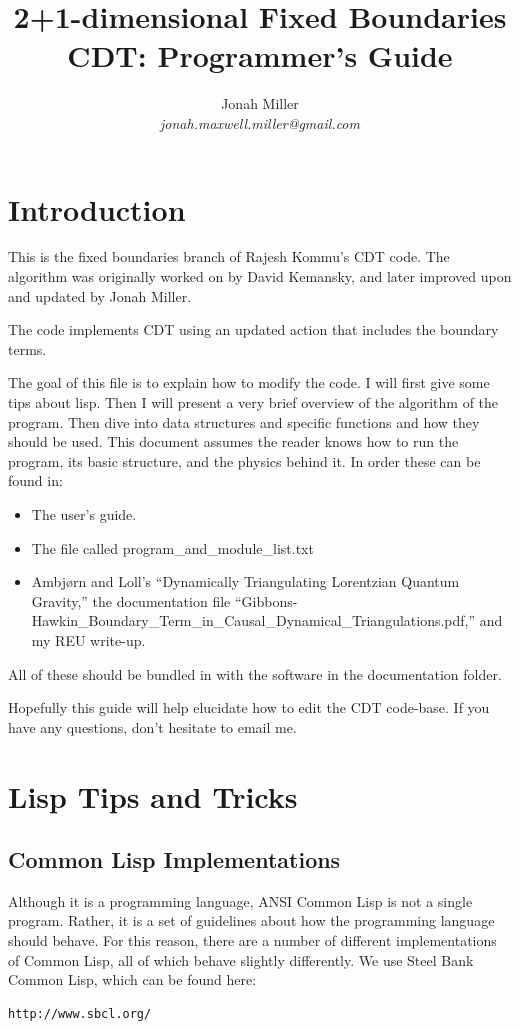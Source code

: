 \message{ !name(programmers_guide.tex)}\documentclass[12pt]{article}
\author{Jonah Miller\\
\textit{jonah.maxwell.miller@gmail.com}}
\title{2+1-dimensional Fixed Boundaries CDT: Programmer's Guide}
\begin{document}

\maketitle

\section{Introduction}
\label{s:intro}

This is the fixed boundaries branch of Rajesh Kommu's CDT code. The
algorithm was originally worked on by David Kemansky, and later
improved upon and updated by Jonah Miller.

The code implements CDT using an updated action that includes the
boundary terms.

The goal of this file is to explain how to modify the code. I will
first give some tips about lisp. Then I will present a very brief
overview of the algorithm of the program. Then dive into data
structures and specific functions and how they should be used. This
document assumes the reader knows how to run the program, its basic
structure, and the physics behind it. In order these can be found in:
\begin{itemize}
\item The user's guide.
\item The file called program\_and\_module\_list.txt
\item Ambj\o rn and Loll's ``Dynamically Triangulating Lorentzian
  Quantum Gravity,'' the documentation file
  ``Gibbons-Hawkin\_Boundary\_Term\_in\_Causal\_Dynamical\_Triangulations.pdf,''
  and my REU write-up.
\end{itemize}
All of these should be bundled in with the software in the
documentation folder.

Hopefully this guide will help elucidate how to edit the CDT
code-base. If you have any questions, don't hesitate to email me.

\section{Lisp Tips and Tricks}
\label{s:lisp:tricks}
\subsection{Common Lisp Implementations}

Although it is a programming language, ANSI Common Lisp is not a
single program. Rather, it is a set of guidelines about how the
programming language should behave. For this reason, there are a
number of different implementations of Common Lisp, all of which
behave slightly differently. We use Steel Bank Common Lisp, which can
be found here:
\begin{verbatim}
http://www.sbcl.org/
\end{verbatim}
\end{document}
